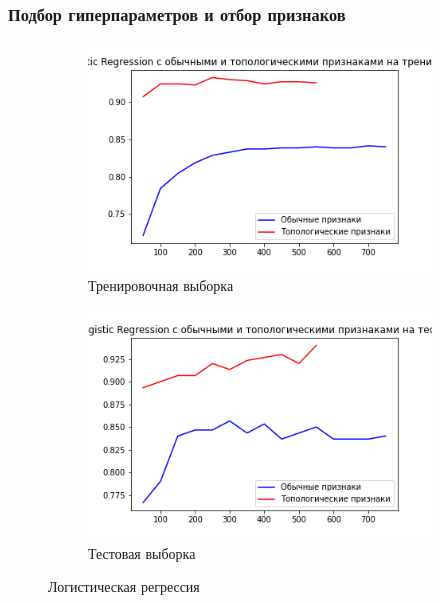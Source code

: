\documentclass{beamer}
\begin{document}
		\begin{frame}
			\frametitle{Подбор гиперпараметров и отбор признаков}
			\begin{figure}
			\begin{subfigure}{0.48\textwidth}
				\includegraphics[width=\linewidth]{log_diff_features_train.png}
				\caption{Тренировочная выборка}
				\label{fig:1}
			\end{subfigure}%
			\begin{subfigure}{0.48\textwidth}
				\includegraphics[width=\linewidth]{log_diff_features_test.png}
				\caption{Тестовая выборка}
				\label{fig:2}
			\end{subfigure}
			\caption{Логистическая регрессия}
			\end{figure}
		\end{frame}
\end{document}
